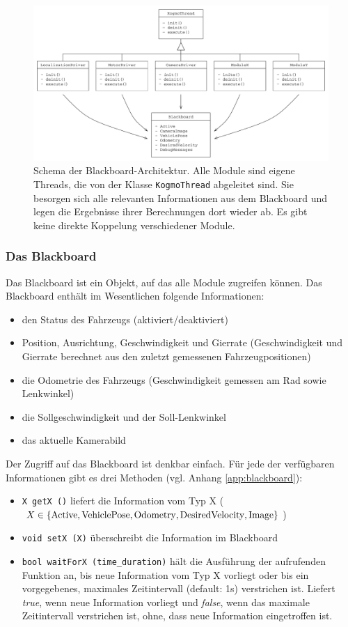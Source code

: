 \documentclass[a4paper, 11pt]{article}
\newcommand{\code}[1]{\texttt{#1}}
\begin{document}
{\begin{figure}
\includegraphics[width=\textwidth]{blackboardArchitecture}
\caption{Schema der Blackboard-Architektur. Alle Module sind eigene Threads, die von der Klasse \code{KogmoThread} abgeleitet sind. Sie besorgen sich alle relevanten Informationen aus dem Blackboard und legen die Ergebnisse ihrer Berechnungen dort wieder ab. Es gibt keine direkte Koppelung verschiedener Module.}
\label{fig:blackboardArchitecture}
\end{figure}

\subsubsection{Das Blackboard}
Das Blackboard ist ein Objekt, auf das alle Module zugreifen können. Das Blackboard enthält im Wesentlichen folgende Informationen:
\begin{itemize}
\item den Status des Fahrzeugs (aktiviert/deaktiviert)
\item Position, Ausrichtung, Geschwindigkeit und Gierrate (Geschwindigkeit und Gierrate berechnet aus den zuletzt gemessenen Fahrzeugpositionen)
\item die Odometrie des Fahrzeugs (Geschwindigkeit gemessen am Rad sowie Lenkwinkel)
\item die Sollgeschwindigkeit und der Soll-Lenkwinkel
\item das aktuelle Kamerabild
\end{itemize}

Der Zugriff auf das Blackboard ist denkbar einfach. Für jede der verfügbaren Informationen gibt es drei Methoden (vgl. Anhang \ref{app:blackboard}):
\begin{itemize}
\item \code{X getX ()} liefert die Information vom Typ X ($X\in \{ \text{Active}, \text{VehiclePose}, \text{Odometry},\linebreak \text{DesiredVelocity}, \text{Image} \}$)
\item \code{void setX (X)} überschreibt die Information im Blackboard
\item \code{bool waitForX (time\_duration)} hält die Ausführung der aufrufenden Funktion an, bis neue Information vom Typ X vorliegt oder bis ein vorgegebenes, maximales Zeitintervall (default: 1s) verstrichen ist. Liefert \textit{true}, wenn neue Information vorliegt und \textit{false}, wenn das maximale Zeitintervall verstrichen ist, ohne, dass neue Information eingetroffen ist.
\end{itemize}

}
\end{document}

